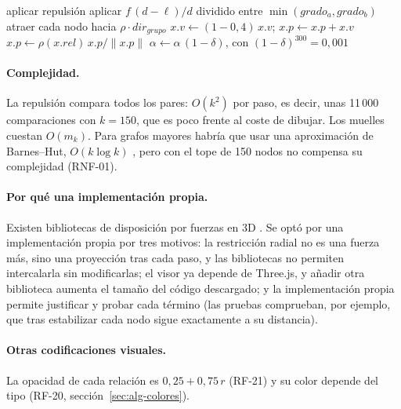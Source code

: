 \begin{algorithm}[htbp]
  \caption{Un paso de la simulación (\texttt{SimulacionFuerzas.paso}).}
  \label{alg:fuerzas}
  \begin{algorithmic}[1]
       \State aplicar repulsión \EndFor {}
       \State aplicar $f\,(d-\ell)/d$ dividido entre $\min(grado_a, grado_b)$ \EndFor
       \State atraer cada nodo hacia $\rho\cdot dir_{grupo}$ \EndIf
        \State $x.v \gets (1-0{,}4)\,x.v$; \quad $x.p \gets x.p + x.v$
        \State $x.p \gets \rho(x.rel)\, x.p / \lVert x.p \rVert$ 
      \EndFor
      \State $\alpha \gets \alpha\,(1-\delta)$, con $(1-\delta)^{300} = 0{,}001$
    \EndProcedure
  \end{algorithmic}
\end{algorithm}

\paragraph{Complejidad.} La repulsión compara todos los pares: $O(k^2)$ por paso, es decir, unas 11\,000 comparaciones con $k=150$, que es poco frente al coste de dibujar. Los muelles cuestan $O(m_k)$. Para grafos mayores habría que usar una aproximación de Barnes--Hut, $O(k\log k)$ \cite{TODO}, pero con el tope de 150 nodos no compensa su complejidad (RNF-01). %

\paragraph{Por qué una implementación propia.} Existen bibliotecas de disposición por fuerzas en 3D \cite{TODO}. Se optó por una implementación propia por tres motivos: la restricción radial no es una fuerza más, sino una proyección tras cada paso, y las bibliotecas no permiten intercalarla sin modificarlas; el visor ya depende de Three.js, y añadir otra biblioteca aumenta el tamaño del código descargado; y la implementación propia permite justificar y probar cada término (las pruebas comprueban, por ejemplo, que tras estabilizar cada nodo sigue exactamente a su distancia).

\paragraph{Otras codificaciones visuales.} La opacidad de cada relación es $0{,}25 + 0{,}75\,r$ (RF-21) y su color depende del tipo (RF-20, sección~\ref{sec:alg-colores}).

